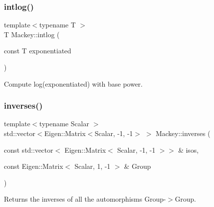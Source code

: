 \subsubsection{\texorpdfstring{intlog()}{intlog()}}
{\footnotesize\ttfamily template$<$typename T $>$ \\
T Mackey\+::intlog (\begin{DoxyParamCaption}\item[{const T}]{exponentiated }\end{DoxyParamCaption})\hspace{0.3cm}{\ttfamily [inline]}}



Compute log(exponentiated) with base power. 

\mbox{\label{namespaceMackey_ac8552763cbbe02f22cedc11c6f8434da}} 
\subsubsection{\texorpdfstring{inverses()}{inverses()}}
{\footnotesize\ttfamily template$<$typename Scalar $>$ \\
std\+::vector$<$Eigen\+::\+Matrix$<$Scalar, -\/1, -\/1$>$ $>$ Mackey\+::inverses (\begin{DoxyParamCaption}\item[{const std\+::vector$<$ Eigen\+::\+Matrix$<$ Scalar, -\/1, -\/1 $>$$>$ \&}]{isos,  }\item[{const Eigen\+::\+Matrix$<$ Scalar, 1, -\/1 $>$ \&}]{Group }\end{DoxyParamCaption})}



Returns the inverses of all the automorphisms Group-\/$>$Group. 

